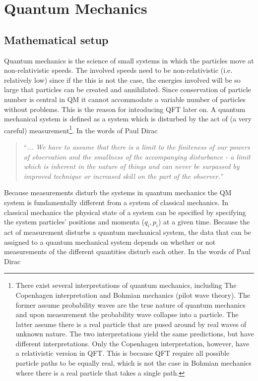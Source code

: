 \part{Quantum Mechanics}

\chapter{Mathematical setup}
Quantum mechanics is the science of small systems in which the particles move at non-relativistic speeds. The involved speeds need to be non-relativistic (i.e. relatively low) since if the this is not the case, the energies involved will be so large that particles can be created and annihilated. Since conservation of particle number is central in QM it cannot accommodate a variable number of particles without problems. This is the reason for introducing QFT later on. \newline
A quantum mechanical system is defined as a system which is disturbed by the act of (a very careful) measurement\footnote{There exist several interpretations of quantum mechanics, including The Copenhagen interpretation and Bohmian mechanics (pilot wave theory). The former assume probability waves are the true nature of quantum mechanics and upon measurement the probability wave collapse into a particle. The latter assume there is a real particle that are pused around by real waves of unknown nature. The two interpretations yield the same predictions, but have different interpretations. Only the Copenhagen interpretation, however, have a relativistic version in QFT. This is because QFT require all possible particle paths to be equally real, which is not the case in Bohmian mechanics where there is a real particle that takes a single path.}. In the words of Paul Dirac~\citep{dirac}
\begin{quote}
	“\textit{... We have to assume that there is a limit to the finiteness of our powers of observation and the smallness of the accompanying disturbance - a limit which is inherent in the nature of things and can never be surpassed by improved technique or increased skill on the part of the observer.}”
\end{quote}
Because measurements disturb the systems in quantum mechanics the QM system is fundamentally different from a system of classical mechanics. In classical mechanics the physical state of a system can be specified by specifying the system particles' positions and momenta ($q_i,p_i$) at a given time. Because the act of measurement disturbs a quantum mechanical system, the data that can be assigned to a quantum mechanical system depends on whether or not measurements of the different quantities disturb each other. In the words of Paul Dirac~\citep[p.11]{dirac}
